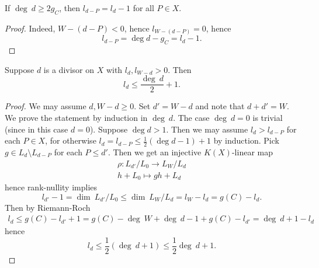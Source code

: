     \begin{corollary}
        If $\deg \ d \geq 2g_C$, then $l_{d-P}=l_{d}-1$ for all $P\in X$. 
    \end{corollary}
    \begin{proof}
        Indeed, $W-(d-P)<0$, hence $l_{W-(d-P)}=0$, hence 
        $$
            l_{d-P}= \deg d -g_C = l_d - 1.
        $$
    \end{proof}
    \begin{corollary}
        Suppose $d$ is a divisor on $X$ with $l_d,l_{W-d}>0$. Then 
        $$
            l_d \leq \frac{\deg \ d }{2}+1.
        $$ 
    \end{corollary}
    \begin{proof}
        We may assume $d,W-d\geq 0$. Set $d' = W-d$ and note that $d+d'=W$. We prove the statement by induction in $\deg \ d$. The case $\deg \ d=0$ is trivial (since in this case $d=0$). Suppose $\deg d>1$. Then we may assume $l_{d} >l_{d-P}$ for each $P\in X$, for otherwise $l_d = l_{d-P} \leq \frac{1}{2}(\deg d -1) + 1$ by induction. Pick $g\in L_d\setminus L_{d-P}$ for each $P\leq d'$. Then we get an injective $K(X)$-linear map 
        \begin{gather*}
            \rho : L_{d'}/L_0 \rightarrow L_W/L_d\\
            h+L_0\mapsto gh + L_d 
        \end{gather*}
        hence rank-nullity implies
        $$
            l_{d'}-1  = \dim \ L_{d'}/L_0 \leq \dim \ L_W/L_d = l_W-l_d = g(C) - l_d. 
        $$ 
        Then by Riemann-Roch 
        \begin{align*}
            l_d \leq g(C)-l_{d'}+1 = g(C)-\deg \ W + \deg \ d -1+g(C)-l_{d'} = \deg \ d +1 -l_{d}  
        \end{align*}
        hence 
        $$
            l_d \leq \frac{1}{2}(\deg \ d +1)\leq \frac{1}{2}\deg \ d +1.  
        $$
    \end{proof}
